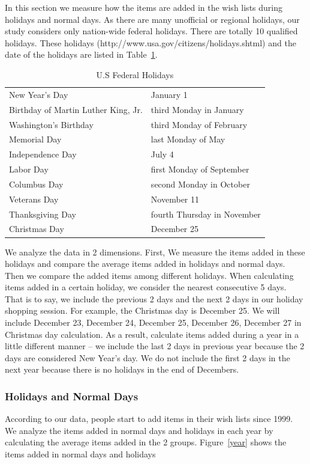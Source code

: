 In this section we measure how the items are added in the wish lists during holidays and normal days. As there are many unofficial or regional holidays, our study considers only nation-wide federal holidays. There are totally 10 qualified holidays. These holidays (http://www.usa.gov/citizens/holidays.shtml) and the date of the holidays are listed in Table~\ref{tb:holiday}.

\begin{table}[!ht]
\centering
\caption{U.S Federal Holidays}
\label{tb:holiday}
\begin{adjustbox}{max width=.45\textwidth}
\begin{tabular}{ll}
New Year's Day & January 1  \\
Birthday of Martin Luther King, Jr. & third Monday in January  \\
Washington's Birthday & third Monday of February  \\
Memorial Day & last Monday of May \\
Independence Day & July 4  \\
Labor Day & first Monday of September  \\
Columbus Day & second Monday in October  \\
Veterans Day & November 11  \\
Thanksgiving Day & fourth Thursday in November  \\
Christmas Day & December 25  \\
\end{tabular}
\end{adjustbox}
\end{table}

We analyze the data in 2 dimensions. First, We measure the items added in these holidays and compare the average items added in holidays and normal days. Then we compare the added items among different holidays. When calculating items added in a certain holiday, we consider the nearest consecutive 5 days. That is to say, we include the previous 2 days and the next 2 days in our holiday shopping session. For example, the Christmas day is December 25. We will include December 23, December 24, December 25, December 26, December 27 in Christmas day calculation. As a result, calculate items added during a year in a little different manner -- we include the last 2 days in previous year because the 2 days are considered New Year's day. We do not include the first 2 days in the next year because there is no holidays in the end of Decembers.


\subsubsection{Holidays and Normal Days}
According to our data, people start to add items in their wish lists since 1999. We analyze the items added in normal days and holidays in each year by calculating the average items added in the 2 groups. Figure~\ref{year} shows the items added in normal days and holidays 



